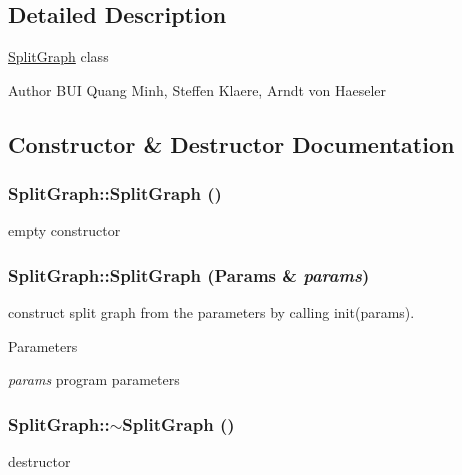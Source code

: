 \subsection{Detailed Description}
\hyperlink{classSplitGraph}{SplitGraph} class

\begin{DoxyAuthor}{Author}
BUI Quang Minh, Steffen Klaere, Arndt von Haeseler 
\end{DoxyAuthor}


\subsection{Constructor \& Destructor Documentation}
\hypertarget{classSplitGraph_aea160f196766a6573809410979e0df5b}{
\subsubsection[{SplitGraph}]{\setlength{\rightskip}{0pt plus 5cm}SplitGraph::SplitGraph ()}}
\label{classSplitGraph_aea160f196766a6573809410979e0df5b}
empty constructor \hypertarget{classSplitGraph_aec55fe3e947b56545f57c9c596ec20a3}{
\subsubsection[{SplitGraph}]{\setlength{\rightskip}{0pt plus 5cm}SplitGraph::SplitGraph ({\bf Params} \& {\em params})}}
\label{classSplitGraph_aec55fe3e947b56545f57c9c596ec20a3}
construct split graph from the parameters by calling init(params). 
\begin{DoxyParams}{Parameters}
\item[{\em params}]program parameters \end{DoxyParams}
\hypertarget{classSplitGraph_a40780d552131a67c8cdb5b20037dbd16}{
\subsubsection[{$\sim$SplitGraph}]{\setlength{\rightskip}{0pt plus 5cm}SplitGraph::$\sim$SplitGraph ()}}
\label{classSplitGraph_a40780d552131a67c8cdb5b20037dbd16}
destructor 

